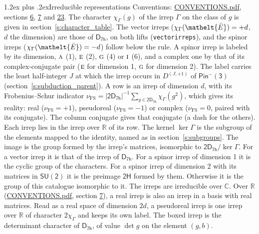 \documentclass[10pt,a4paper]{article}
\makeatletter
\renewcommand\section{\@startsection{section}{1}{\z@}{-3ex plus -1ex minus -.2ex}%
  {1.2ex plus .2ex}{\normalfont\large\sffamily\bfseries\color{parttitle}}}
\numberwithin{equation}{section}
\newcommand{\eltfont}[1]{{\let\sigma\eltsigma\mathelt{#1}}}
\newcommand{\grp}[1]{\mathsf{#1}}
\newcommand{\irr}[1]{\text{\normalfont\scshape #1}}
\newcommand{\elt}[1]{\eltfont{#1}}
\newcommand{\irrJp}[2]{D^{(#1,#2)}}
\newcommand{\irchar}[1]{\chi_{#1}}
\newcommand{\fsind}{\nu_{\mathrm{FS}}}
\newcommand{\barred}[1]{\bar{#1}}
\makeatother
\begin{document}
\section{Irreducible representations}\label{s:irreps}
Conventions: \href{../../CONVENTIONS.pdf}{CONVENTIONS.pdf}, sections \href{../../../rotation/CONVENTIONS.pdf\#conv.6}{6}, \href{../../../rotation/CONVENTIONS.pdf\#conv.7}{7} and \href{../../CONVENTIONS.pdf\#conv.23}{23}.
\leavevmode\label{n:function.character}\label{n:irrep.Gamma}The character $\irchar{\Gamma}(g)$ of the irrep $\Gamma$ on the class of $g$ is given in section~\ref{s:character_table}. \label{n:index.dimension}The vector irreps ($\irchar{\Gamma}(\elt{\barred{E}}) = +d$, $d$ the dimension) are those of \href{../../../rotation/data/pdf/D7h.pdf}{$\grp{D_{7h}}$}, on both lifts (\texttt{vectorirreps}), and the spinor irreps ($\irchar{\Gamma}(\elt{\barred{E}}) = -d$) follow below the rule. A spinor irrep is labeled by its dimension, $\irr{a}$ (1), $\irr{e}$ (2), $\irr{g}$ (4) or $\irr{i}$ (6), and a complex one by that of its complex-conjugate pair ($\irr{e}$ for dimension 1, $\irr{g}$ for dimension 2). The label carries the least half-integer $J$ at which the irrep occurs in $\irrJp{J}{+1}$ of $\grp{Pin^{-}(3)}$ (section~\ref{s:subduction_parent}).
\leavevmode\label{n:index.frobenius}\label{n:head.irrep}\label{n:head.reality}A row is an irrep of dimension $d$, with its Frobenius--Schur indicator $\fsind = |\grp{2D_{7h}}|^{-1}\allowbreak\sum_{g\in\grp{2D_{7h}}}\irchar{\Gamma}(g^2)$, which gives its reality: real ($\fsind = +1$), pseudoreal ($\fsind = -1$) or complex ($\fsind = 0$, paired with its conjugate). \label{n:head.conjugate}The column conjugate gives that conjugate (a dash for the others). \label{n:head.over.real}Each irrep lies in the irrep over $\mathbb{R}$ of its row. \label{n:head.kernel}The kernel $\ker\Gamma$ is the subgroup of the elements mapped to the identity, named as in section~\ref{s:subgroups}. \label{n:head.image}The image is the group formed by the irrep's matrices, isomorphic to $\grp{2D_{7h}}/\ker\Gamma$. For a vector irrep it is that of the irrep of \href{../../../rotation/data/pdf/D7h.pdf}{$\grp{D_{7h}}$}. For a spinor irrep of dimension 1 it is the cyclic group of the characters. For a spinor irrep of dimension 2 with its matrices in $\grp{SU(2)}$ it is the preimage $\grp{2H}$ formed by them. Otherwise it is the group of this catalogue isomorphic to it. The irreps are irreducible over $\mathbb{C}$. Over $\mathbb{R}$ (\href{../../CONVENTIONS.pdf}{CONVENTIONS.pdf}, section \href{../../../rotation/CONVENTIONS.pdf\#conv.7}{7}), a real irrep is also an irrep in a basis with real matrices. Read as a real space of dimension $2d$, a pseudoreal irrep is one irrep over $\mathbb{R}$ of character $2\irchar{\Gamma}$ and keeps its own label. \label{n:mark.determinant}The boxed irrep is the determinant character of \href{../../../rotation/data/pdf/D7h.pdf}{$\grp{D_{7h}}$}, of value $\det g$ on the element $(g, b)$.
\end{document}
